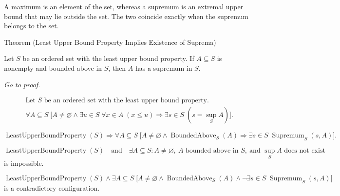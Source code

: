 \begin{remark*}
A maximum is an element of the set, whereas a supremum is an extremal upper bound that may lie
outside the set. The two coincide exactly when the supremum belongs to the set.
\end{remark*}







\begin{theorembox}{Theorem (Least Upper Bound Property Implies Existence of Suprema)}
\begin{theorem}
\label{thm:lub-property-implies-existence-of-suprema}
Let $S$ be an ordered set with the least upper bound property. If $A\subseteq S$ is nonempty and bounded above in $S$, then $A$ has a supremum in $S$.

\smallskip
\noindent
\hyperref[prf:lub-property-implies-existence-of-suprema]{\textit{Go to proof.}}
\end{theorem}
\end{theorembox}

\begin{remark*}
\[
\begin{aligned}
&\text{Let }S\text{ be an ordered set with the least upper bound property.}\\
&\forall A\subseteq S\;
\bigl[
A\ne\varnothing
\land
\exists u\in S\;\forall x\in A\;(x\le u)
\Longrightarrow
\exists s\in S\;(s=\sup_S A)
\bigr].
\end{aligned}
\]
\end{remark*}

\begin{remark*}
\[
\operatorname{LeastUpperBoundProperty}(S)
\Longrightarrow
\forall A\subseteq S\;
\bigl[
A\ne\varnothing
\land
\operatorname{BoundedAbove}_S(A)
\Longrightarrow
\exists s\in S\;\operatorname{Supremum}_S(s,A)
\bigr].
\]
\end{remark*}

\begin{remark*}
\[
\operatorname{LeastUpperBoundProperty}(S)
\quad\text{and}\quad
\exists A\subseteq S:
A\ne\varnothing,\ A\text{ bounded above in }S,\ \text{and }\sup_S A\text{ does not exist}
\]
is impossible.
\end{remark*}

\begin{remark*}
\[
\operatorname{LeastUpperBoundProperty}(S)
\land
\exists A\subseteq S\;
\bigl[A\ne\varnothing
\land \operatorname{BoundedAbove}_S(A)
\land
\neg\exists s\in S\;\operatorname{Supremum}_S(s,A)\bigr]
\]
is a contradictory configuration.
\end{remark*}

